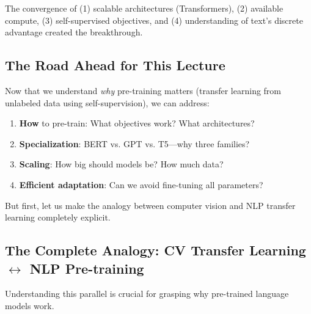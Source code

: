 \documentclass{article}
\begin{document}
The convergence of (1) scalable architectures (Transformers), (2) available compute, (3) self-supervised objectives, and (4) understanding of text's discrete advantage created the breakthrough.

\subsection{The Road Ahead for This Lecture}

Now that we understand \textit{why} pre-training matters (transfer learning from unlabeled data using self-supervision), we can address:

\begin{enumerate}
\item \textbf{How} to pre-train: What objectives work? What architectures?
\item \textbf{Specialization}: BERT vs. GPT vs. T5---why three families?
\item \textbf{Scaling}: How big should models be? How much data?
\item \textbf{Efficient adaptation}: Can we avoid fine-tuning all parameters?
\end{enumerate}

But first, let us make the analogy between computer vision and NLP transfer learning completely explicit.

\subsection{The Complete Analogy: CV Transfer Learning $\leftrightarrow$ NLP Pre-training}

Understanding this parallel is crucial for grasping why pre-trained language models work.
\end{document}
